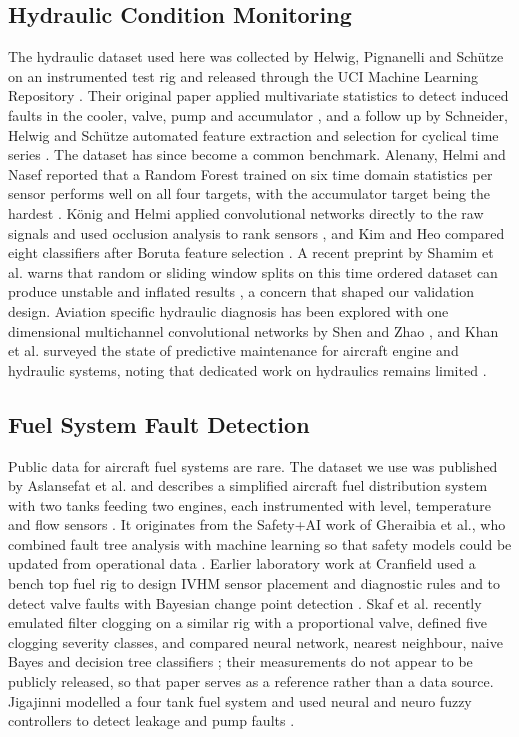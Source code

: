 \documentclass[conference]{IEEEtran}
\begin{document}
\subsection{Hydraulic Condition Monitoring}
The hydraulic dataset used here was collected by Helwig, Pignanelli and Sch\"utze on an instrumented test rig and released through the UCI Machine Learning Repository \cite{b25}. Their original paper applied multivariate statistics to detect induced faults in the cooler, valve, pump and accumulator \cite{b26}, and a follow up by Schneider, Helwig and Sch\"utze automated feature extraction and selection for cyclical time series \cite{b27}. The dataset has since become a common benchmark. Alenany, Helmi and Nasef reported that a Random Forest trained on six time domain statistics per sensor performs well on all four targets, with the accumulator target being the hardest \cite{b28}. K\"onig and Helmi applied convolutional networks directly to the raw signals and used occlusion analysis to rank sensors \cite{b29}, and Kim and Heo compared eight classifiers after Boruta feature selection \cite{b30}. A recent preprint by Shamim et al. warns that random or sliding window splits on this time ordered dataset can produce unstable and inflated results \cite{b32}, a concern that shaped our validation design. Aviation specific hydraulic diagnosis has been explored with one dimensional multichannel convolutional networks by Shen and Zhao \cite{b31}, and Khan et al. surveyed the state of predictive maintenance for aircraft engine and hydraulic systems, noting that dedicated work on hydraulics remains limited \cite{b7}.

\subsection{Fuel System Fault Detection}
Public data for aircraft fuel systems are rare. The dataset we use was published by Aslansefat et al. and describes a simplified aircraft fuel distribution system with two tanks feeding two engines, each instrumented with level, temperature and flow sensors \cite{b33}. It originates from the Safety+AI work of Gheraibia et al., who combined fault tree analysis with machine learning so that safety models could be updated from operational data \cite{b34}. Earlier laboratory work at Cranfield used a bench top fuel rig to design IVHM sensor placement and diagnostic rules \cite{b36} and to detect valve faults with Bayesian change point detection \cite{b37}. Skaf et al. recently emulated filter clogging on a similar rig with a proportional valve, defined five clogging severity classes, and compared neural network, nearest neighbour, naive Bayes and decision tree classifiers \cite{b35}; their measurements do not appear to be publicly released, so that paper serves as a reference rather than a data source. Jigajinni modelled a four tank fuel system and used neural and neuro fuzzy controllers to detect leakage and pump faults \cite{b38}.
\end{document}
